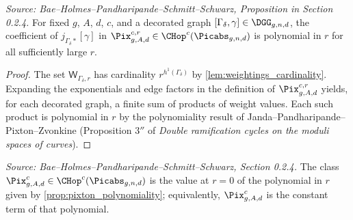 \begin{proposition}
  \label{prop:pixton_polynomiality}
  \textit{Source: Bae--Holmes--Pandharipande--Schmitt--Schwarz, Proposition in Section 0.2.4.}
  For fixed $g$, $A$, $d$, $c$, and a decorated graph $[\Gamma_\delta, \gamma] \in \DGG_{g,n,d}$,
  the coefficient of $j_{\Gamma_\delta*}[\gamma]$ in
  $\Pix^{c,r}_{g,A,d} \in \CHop^c(\Picabs_{g,n,d})$
  is polynomial in $r$ for all sufficiently large $r$.
\end{proposition}

\begin{proof}
  The set $\mathsf{W}_{\Gamma_\delta,r}$ has cardinality $r^{h^1(\Gamma_\delta)}$ by
  \cref{lem:weightings_cardinality}.  Expanding the exponentials and edge factors in
  the definition of $\Pix^{c,r}_{g,A,d}$ yields, for each decorated graph, a finite sum of
  products of weight values.  Each such product is polynomial in $r$ by the polynomiality
  result of Janda--Pandharipande--Pixton--Zvonkine (Proposition $3''$ of
  \textit{Double ramification cycles on the moduli spaces of curves}).
\end{proof}

\begin{definition}
  \label{def:pixton_formula}
  \textit{Source: Bae--Holmes--Pandharipande--Schmitt--Schwarz, Section 0.2.4.}
  The class $\Pix^c_{g,A,d} \in \CHop^c(\Picabs_{g,n,d})$ is the value at $r = 0$ of
  the polynomial in $r$ given by \cref{prop:pixton_polynomiality}; equivalently,
  $\Pix^c_{g,A,d}$ is the constant term of that polynomial.
\end{definition}

